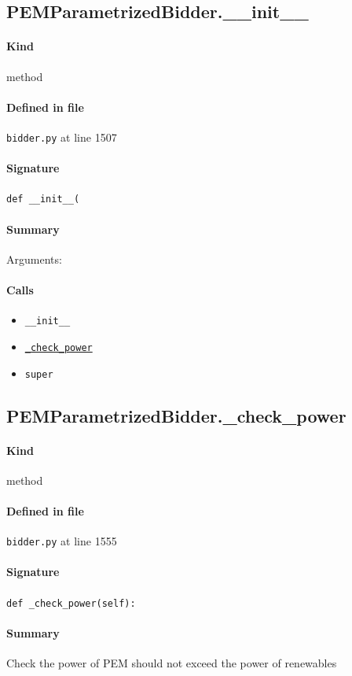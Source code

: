\documentclass[11pt]{report}
\begin{document}
\subsection{PEMParametrizedBidder.\_\_init\_\_}
\label{def:bidder.py:PEMParametrizedBidder.__init__:L1507}
\paragraph{Kind} method
\paragraph{Defined in file} \texttt{bidder.py} at line 1507
\paragraph{Signature} \texttt{def \_\_init\_\_(}
\paragraph{Summary} Arguments:
\paragraph{Calls}
\begin{itemize}[leftmargin=*]
  \item \texttt{\_\_init\_\_}
  \item \hyperref[def:bidder.py:PEMParametrizedBidder._check_power:L1555]{\texttt{\_check\_power}}
  \item \texttt{super}
\end{itemize}
\subsection{PEMParametrizedBidder.\_check\_power}
\label{def:bidder.py:PEMParametrizedBidder._check_power:L1555}
\paragraph{Kind} method
\paragraph{Defined in file} \texttt{bidder.py} at line 1555
\paragraph{Signature} \texttt{def \_check\_power(self):}
\paragraph{Summary} Check the power of PEM should not exceed the power of renewables
\end{document}
